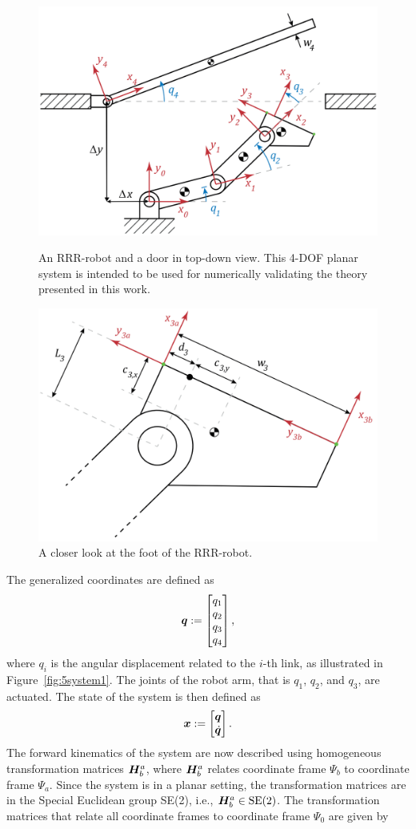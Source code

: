 \documentclass[../DC2019003Bouma.tex]{subfiles}
\begin{document}
%
%
\begin{figure}[bt!]
\centering
\includegraphics[width=.7\textwidth]{system.PNG}\caption{An RRR-robot and a door in top-down view. This 4-DOF planar system is intended to be used for numerically validating the theory presented in this work.}\label{fig:5system1}
\includegraphics[width=.7\textwidth]{system2.PNG}\caption{A closer look at the foot of the RRR-robot.}
\label{fig:5system2}
\end{figure}

The generalized coordinates are defined as 
\begin{align}
{\boldsymbol{q}} := \begin{bmatrix}
q_1\\q_2\\q_3\\q_4
\end{bmatrix},
\end{align}
where $q_i$ is the angular displacement related to the $i$-th link, as illustrated in Figure~\ref{fig:5system1}. The joints of the robot arm, that is $q_1$, $q_2$, and $q_3$, are actuated. The state of the system is then defined as
\begin{align}
{\boldsymbol{x}} := \begin{bmatrix}
{\boldsymbol{q}}\\\dot{{\boldsymbol{q}}}
\end{bmatrix}.
\end{align}
The forward kinematics of the system are now described using homogeneous transformation matrices ${\boldsymbol{H}}^a_b$, where ${\boldsymbol{H}}^a_b$ relates coordinate frame $\Psi_b$ to coordinate frame $\Psi_a$. Since the system is in a planar setting, the transformation matrices are in the Special Euclidean group SE(2), i.e., ${\boldsymbol{H}}^a_b\in \textnormal{SE}(2)$. The transformation matrices that relate all coordinate frames to coordinate frame $\Psi_0$ are given by
\end{document}
